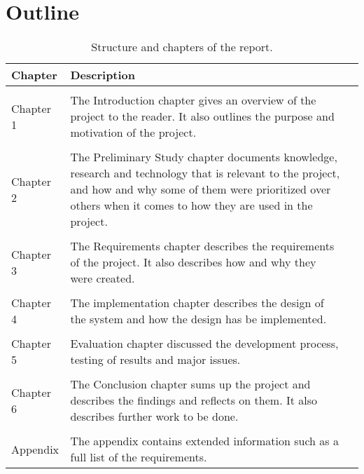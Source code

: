 \section{Outline}
\begin{table}[H]
  \centering
  \begin{tabularx}{\textwidth}{ l X l }
    \textbf{Chapter}      & \textbf{Description} \\
    \hline \\ [-1.5ex]
    Chapter 1 & The Introduction chapter gives an overview of the project to the reader. It also outlines the purpose and motivation of the project. \\
    \hline \\ [-1.5ex]
    Chapter 2 & The Preliminary Study chapter documents knowledge, research and technology that is relevant to the project, and how and why some of them were prioritized over others when it comes to how they are used in the project. \\
    \hline \\ [-1.5ex]
    Chapter 3 & The Requirements chapter describes the requirements of the project. It also describes how and why they were created. \\
    \hline \\ [-1.5ex]
    Chapter 4 & The implementation chapter describes the design of the system and how the design has be implemented. \\
    \hline \\ [-1.5ex]
    Chapter 5 & Evaluation chapter discussed the development process, testing of results and major issues. \\
    \hline \\ [-1.5ex]
    Chapter 6 & The Conclusion chapter sums up the project and describes the findings and reflects on them. It also describes further work to be done. \\
    \hline \\ [-1.5ex]
    Appendix & The appendix contains extended information such as a full list of the requirements. \\
  \end{tabularx}
  \caption{Structure and chapters of the report.}
  \label{table-reportstructure}
\end{table}
